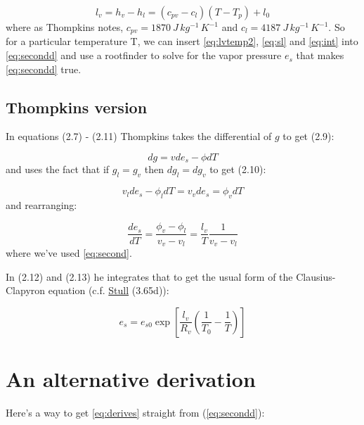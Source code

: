 \documentclass[12pt]{article}
\begin{document}
\begin{equation}
  \label{eq:lvtemp2}
  l_v = h_v - h_l = (c_{pv} - c_l) (T - T_p) + l_0
\end{equation}
where as Thompkins notes, $c_{pv} = 1870\ J\,kg^{-1}\,K^{-1}$ and $c_l=4187\ J\,kg^{-1}\,K^{-1}$.  So for a particular temperature T,
we can insert \eqref{eq:lvtemp2},  \eqref{eq:sl} and \eqref{eq:int} into \eqref{eq:secondd} 
and use a rootfinder to solve for the vapor pressure $e_s$ that makes \eqref{eq:secondd} true.


\subsection{Thompkins version}
\label{sec:thompkins-version}

In equations (2.7) - (2.11) Thompkins takes the differential of $g$ to get (2.9):

\begin{equation}
  \label{eq:diffg}
  dg = v de_s - \phi dT
\end{equation}
and uses the fact that if $g_l = g_v$ then $dg_l = dg_v$ to get (2.10):

\begin{equation}
  \label{eq:dgvequal}
  v_l de_s - \phi_l dT = v_v de_s = \phi_v dT
\end{equation}
and rearranging:

\begin{equation}
  \label{eq:derives}
  \frac{de_s}{dT} = \frac{\phi_v - \phi_l}{v_v - v_l} = \frac{l_v}{T} \frac{1}{v_v -v_l}
\end{equation}
where we've used \eqref{eq:second}.

In (2.12) and (2.13) he integrates that to get the usual form of the Clausius-Clapyron equation (c.f. 
\href{https://www.eoas.ubc.ca/books/Practical_Meteorology}%
{Stull} (3.65d)):

\begin{equation}
  \label{eq:ccfinal}
  e_s = e_{s0} \exp \left [ \frac{l_v}{R_v} \left ( \frac{1}{T_0} - \frac{1}{T} \right ) \right ]
\end{equation}

\section{An alternative derivation}
\label{sec:entropy-mixture}

Here's a way to get \eqref{eq:derives} straight from (\ref{eq:secondd}):
\end{document}
